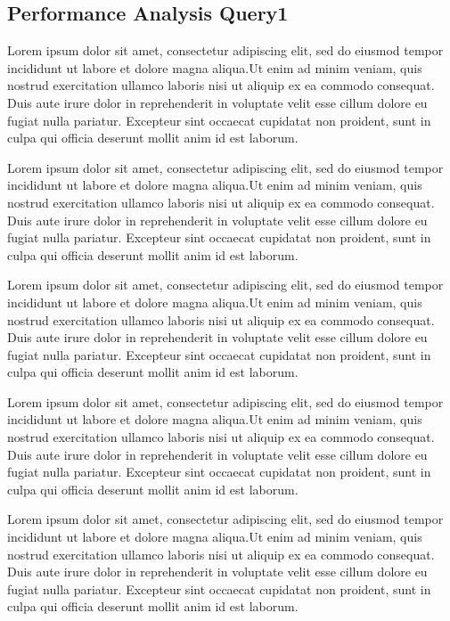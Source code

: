 \subsection{Performance Analysis Query1}
Lorem ipsum dolor sit amet, consectetur adipiscing elit, sed do eiusmod tempor incididunt ut labore et dolore magna aliqua.Ut enim ad minim veniam, quis nostrud exercitation ullamco laboris nisi ut aliquip ex ea commodo consequat. Duis aute irure dolor in reprehenderit in voluptate velit esse cillum dolore eu fugiat nulla pariatur. Excepteur sint occaecat cupidatat non proident, sunt in culpa qui officia deserunt mollit anim id est laborum.


Lorem ipsum dolor sit amet, consectetur adipiscing elit, sed do eiusmod tempor incididunt ut labore et dolore magna aliqua.Ut enim ad minim veniam, quis nostrud exercitation ullamco laboris nisi ut aliquip ex ea commodo consequat. Duis aute irure dolor in reprehenderit in voluptate velit esse cillum dolore eu fugiat nulla pariatur. Excepteur sint occaecat cupidatat non proident, sunt in culpa qui officia deserunt mollit anim id est laborum.


Lorem ipsum dolor sit amet, consectetur adipiscing elit, sed do eiusmod tempor incididunt ut labore et dolore magna aliqua.Ut enim ad minim veniam, quis nostrud exercitation ullamco laboris nisi ut aliquip ex ea commodo consequat. Duis aute irure dolor in reprehenderit in voluptate velit esse cillum dolore eu fugiat nulla pariatur. Excepteur sint occaecat cupidatat non proident, sunt in culpa qui officia deserunt mollit anim id est laborum.


Lorem ipsum dolor sit amet, consectetur adipiscing elit, sed do eiusmod tempor incididunt ut labore et dolore magna aliqua.Ut enim ad minim veniam, quis nostrud exercitation ullamco laboris nisi ut aliquip ex ea commodo consequat. Duis aute irure dolor in reprehenderit in voluptate velit esse cillum dolore eu fugiat nulla pariatur. Excepteur sint occaecat cupidatat non proident, sunt in culpa qui officia deserunt mollit anim id est laborum.


Lorem ipsum dolor sit amet, consectetur adipiscing elit, sed do eiusmod tempor incididunt ut labore et dolore magna aliqua.Ut enim ad minim veniam, quis nostrud exercitation ullamco laboris nisi ut aliquip ex ea commodo consequat. Duis aute irure dolor in reprehenderit in voluptate velit esse cillum dolore eu fugiat nulla pariatur. Excepteur sint occaecat cupidatat non proident, sunt in culpa qui officia deserunt mollit anim id est laborum.